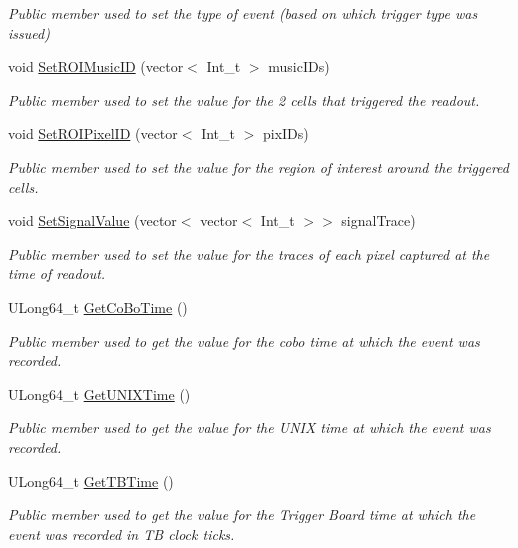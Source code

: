 \begin{DoxyCompactItemize}
\begin{DoxyCompactList}\small\item\em Public member used to set the type of event (based on which trigger type was issued) \end{DoxyCompactList}\item 
void \hyperlink{classEvent_aba7eeb4eb55183924e5a89e2256b9f5a}{Set\+R\+O\+I\+Music\+ID} (vector$<$ Int\+\_\+t $>$ music\+I\+Ds)
\begin{DoxyCompactList}\small\item\em Public member used to set the value for the 2 cells that triggered the readout. \end{DoxyCompactList}\item 
void \hyperlink{classEvent_afd0ba9e203e0619bc8022bb4579d9eea}{Set\+R\+O\+I\+Pixel\+ID} (vector$<$ Int\+\_\+t $>$ pix\+I\+Ds)
\begin{DoxyCompactList}\small\item\em Public member used to set the value for the region of interest around the triggered cells. \end{DoxyCompactList}\item 
void \hyperlink{classEvent_a7d14a089a358b6ac34b19db29b37d089}{Set\+Signal\+Value} (vector$<$ vector$<$ Int\+\_\+t $>$$>$ signal\+Trace)
\begin{DoxyCompactList}\small\item\em Public member used to set the value for the traces of each pixel captured at the time of readout. \end{DoxyCompactList}\item 
U\+Long64\+\_\+t \hyperlink{classEvent_a2e1f120d13a6ebdd348546ee057cb72b}{Get\+Co\+Bo\+Time} ()
\begin{DoxyCompactList}\small\item\em Public member used to get the value for the cobo time at which the event was recorded. \end{DoxyCompactList}\item 
U\+Long64\+\_\+t \hyperlink{classEvent_aa62f35c4492f0111b8142362f608b5bf}{Get\+U\+N\+I\+X\+Time} ()
\begin{DoxyCompactList}\small\item\em Public member used to get the value for the U\+N\+IX time at which the event was recorded. \end{DoxyCompactList}\item 
U\+Long64\+\_\+t \hyperlink{classEvent_afe50196d5416bcf700843a2d299efa9f}{Get\+T\+B\+Time} ()
\begin{DoxyCompactList}\small\item\em Public member used to get the value for the Trigger Board time at which the event was recorded in TB clock ticks. \end{DoxyCompactList}\item 
$$
\end{DoxyCompactItemize}
